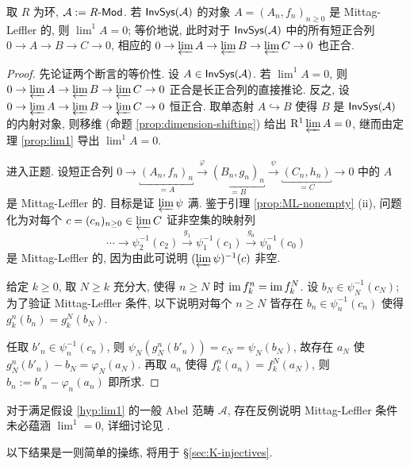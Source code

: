 \begin{proposition}\label{prop:ML-exactness}
	取 $R$ 为环, $\mathcal{A} := R\text{-}\mathsf{Mod}$. 若 $\mathsf{InvSys}(\mathcal{A})$ 的对象 $A = (A_n, f_n)_{n \geq 0}$ 是 Mittag-Leffler 的, 则 $\lim^1 A = 0$; 等价地说, 此时对于 $\mathsf{InvSys}(\mathcal{A})$ 中的所有短正合列 $0 \to A \to B \to C \to 0$, 相应的 $0 \to \varprojlim A \to \varprojlim B \to \varprojlim C \to 0$ 也正合.
\end{proposition}
\begin{proof}
	先论证两个断言的等价性. 设 $A \in \mathsf{InvSys}(\mathcal{A})$. 若 $\lim^1 A = 0$, 则 $0 \to \varprojlim A \to \varprojlim B \to \varprojlim C \to 0$ 正合是长正合列的直接推论. 反之, 设 $0 \to \varprojlim A \to \varprojlim B \to \varprojlim C \to 0$ 恒正合. 取单态射 $A \hookrightarrow B$ 使得 $B$ 是 $\mathsf{InvSys}(\mathcal{A})$ 的内射对象, 则移维 (命题 \ref{prop:dimension-shifting}) 给出 $\mathrm{R}^1 \varprojlim A = 0$, 继而由定理 \ref{prop:lim1} 导出 $\lim^1 A = 0$.
	
	进入正题. 设短正合列 $0 \to \underbracket{(A_n, f_n)_n}_{= A} \xrightarrow{\varphi} \underbracket{(B_n, g_n)_n}_{= B} \xrightarrow{\psi} \underbracket{(C_n, h_n)}_{= C} \to 0$ 中的 $A$ 是 Mittag-Leffler 的. 目标是证 $\varprojlim \psi$ 满. 鉴于引理 \ref{prop:ML-nonempty} (ii), 问题化为对每个 $c = (c_n)_{n \geq 0} \in \varprojlim C$ 证非空集的映射列
	\[ \cdots \to \psi_2^{-1}(c_2) \xrightarrow{g_1} \psi_1^{-1}(c_1) \xrightarrow{g_0} \psi_0^{-1}(c_0) \]
	是 Mittag-Leffler 的, 因为由此可说明 $(\varprojlim \psi)^{-1}(c)$ 非空.
	
	给定 $k \geq 0$, 取 $N \geq k$ 充分大, 使得 $n \geq N$ 时 $\operatorname{im} f^n_k = \operatorname{im} f^N_k$. 设 $b_N \in \psi_N^{-1}(c_N)$; 为了验证 Mittag-Leffler 条件, 以下说明对每个 $n \geq N$ 皆存在 $b_n \in \psi_n^{-1}(c_n)$ 使得 $g^n_k(b_n) = g^N_k(b_N)$.
	
	任取 $b'_n \in \psi_n^{-1}(c_n)$, 则 $\psi_N\left( g^n_N(b'_n)\right) = c_N = \psi_N\left(b_N \right)$, 故存在 $a_N$ 使 $g^n_N(b'_n) - b_N = \varphi_N(a_N)$. 再取 $a_n$ 使得 $f^n_k(a_n) = f^N_k(a_N)$, 则 $b_n := b'_n - \varphi_n(a_n)$ 即所求.
\end{proof}

对于满足假设 \ref{hyp:lim1} 的一般 Abel 范畴 $\mathcal{A}$, 存在反例说明 Mittag-Leffler 条件未必蕴涵 $\lim^1 = 0$, 详细讨论见 \cite{Roo06}.

以下结果是一则简单的操练, 将用于 \S\ref{sec:K-injectives}.


